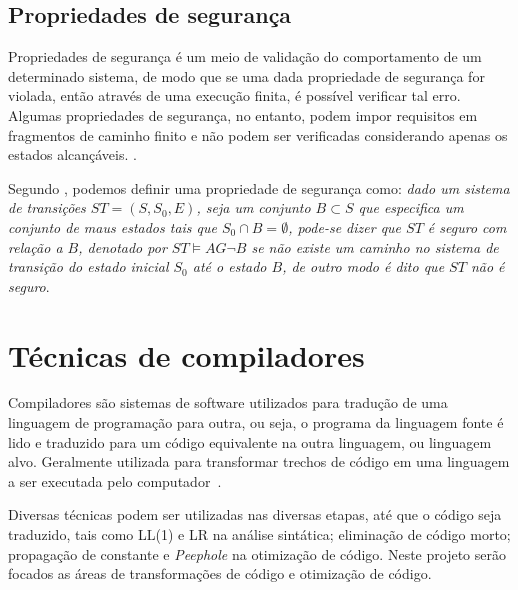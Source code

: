 \subsection{Propriedades de segurança}

Propriedades de segurança é um meio de validação do comportamento de um determinado sistema, de modo que se uma dada propriedade de segurança for violada, então através de uma execução finita, é possível verificar tal erro. Algumas propriedades de segurança, no entanto, podem impor requisitos em fragmentos de caminho finito e não podem ser verificadas considerando apenas os estados alcançáveis. \cite{baier2008principles}.

\par
Segundo \cite{clarke2003verification}, podemos definir uma propriedade de segurança como: \textit{dado um sistema de transições $ST = (S, S_0, E)$, seja um conjunto $B \subset S$ que especifica um conjunto de maus estados tais que $S_0 \cap B = \emptyset$, pode-se dizer que $ST$ é seguro com relação a $B$, denotado por $ST \models AG\neg B$ se não existe um caminho no sistema de transição do estado inicial $S_0$ até o estado $B$, de outro modo é dito que $ST$ não é seguro}.



\section{Técnicas de compiladores}
\par
Compiladores são sistemas de software utilizados para tradução de uma linguagem de programação para outra, ou seja, o programa da linguagem fonte é lido e traduzido para um código equivalente na outra linguagem, ou linguagem alvo. Geralmente utilizada para transformar trechos de código em uma linguagem a ser executada pelo computador~\cite{aho2007compilers}. 

\par
Diversas técnicas podem ser utilizadas nas diversas etapas, até que o código seja traduzido, tais como LL(1) e LR na análise sintática; eliminação de código morto; propagação de constante e \textit{Peephole} na otimização de código\cite{aho2007compilers}. Neste projeto serão focados as áreas de transformações de código e otimização de código.

